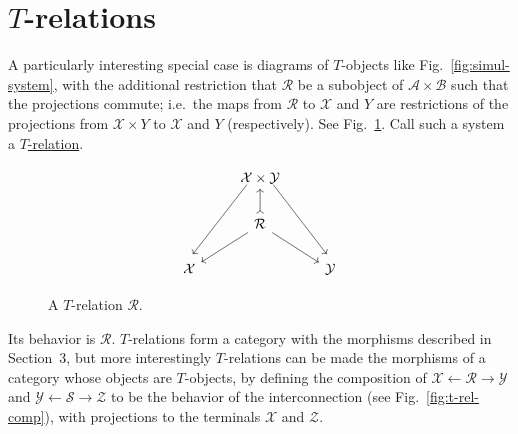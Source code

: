 \documentclass[10pt,a4paper,twocolumn]{article}
\newcommand{\A}{\mathcal{A}}          %
\newcommand{\B}{\mathcal{B}}         %
\newcommand{\Scal}{\mathcal{S}}
\newcommand{\X}{\mathcal{X}}
\newcommand{\Y}{\mathcal{Y}}
\newcommand{\Z}{\mathcal{Z}}
\newcommand{\Rcal}{\mathcal{R}}          %
\newcommand{\origpage}[1]{%
  \marginpar{\raggedright\footnotesize\itshape p.~#1}%
}
\begin{document}
\section{\texorpdfstring{$T$-relations}{T-relations}}

A particularly interesting special case is diagrams of $T$-objects like Fig.~\ref{fig:simul-system}, with the additional restriction that $\Rcal$ be a subobject of $\A\times\B$ such that the projections commute;
i.e.\ the maps from $\Rcal$ to $\X$ and $Y$ are restrictions of the projections from $\X\times Y$ to $\X$ and $Y$ (respectively).
See Fig.~\ref{fig:t-relation}.
Call such a system a \underline{$T$-relation}.

\begin{figure}
  \begin{equation*}
    \begin{tikzcd}
      & {\X \times \Y} & \\
      & \Rcal \\
      \X && \Y
      \arrow[shift right=2, from=1-2, to=3-1]
      \arrow[shift left=2, from=1-2, to=3-3]
      \arrow[tail, from=2-2, to=1-2]
      \arrow[from=2-2, to=3-1]
      \arrow[from=2-2, to=3-3]
    \end{tikzcd}
  \end{equation*}
  \caption{\footnotesize A $T$-relation $\Rcal$.}%
  \label{fig:t-relation}%
\end{figure}
\origpage{128}%
Its behavior is $\Rcal$.
$T$-relations form a category with the morphisms described in Section~3, but more interestingly $T$-relations can be made the morphisms of a category whose objects are $T$-objects, by defining the
composition of $\X \leftarrow \Rcal \to \Y$ and $\Y \leftarrow \Scal \to \Z$ to be the behavior of the interconnection (see Fig.~\ref{fig:t-rel-comp}), with projections to the terminals $\X$ and $\Z$.
\end{document}
